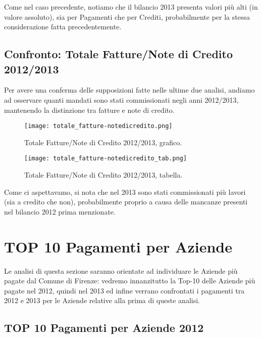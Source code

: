 			Come nel caso precedente, notiamo che il bilancio 2013 presenta valori più alti (in valore assoluto), sia per Pagamenti che per Crediti, probabilmente per la stessa considerazione fatta precedentemente.
			
			\FloatBarrier
			
		\subsection{Confronto: Totale Fatture/Note di Credito 2012/2013} \label{subsec:fatture/notedicredito}
		
			Per avere una conferma delle supposizioni fatte nelle ultime due analisi, andiamo ad osservare quanti mandati sono stati commissionati negli anni 2012/2013, mantenendo la distinzione tra fatture e note di credito.\\
		
			\begin{figure}[h!]
				\centering
					\texttt{[image: totale\_fatture-notedicredito.png]}
				\caption{Totale Fatture/Note di Credito 2012/2013, grafico.}
				\label{fig:totale_fatture-notedicredito}
			\end{figure}
			
			\begin{figure}[h!]
				\centering
					\texttt{[image: totale\_fatture-notedicredito\_tab.png]}
				\caption{Totale Fatture/Note di Credito 2012/2013, tabella.}
				\label{fig:totale_fatture-notedicredito_tab}
			\end{figure}
			
			Come ci aspettavamo, si nota che nel 2013 sono stati commissionati più lavori (sia a credito che non), probabilmente proprio a causa delle mancanze presenti nel bilancio 2012 prima menzionate.
			
			\FloatBarrier
			
	\section{TOP 10 Pagamenti per Aziende} \label{sec:pagamenti_aziende}
		
		Le analisi di questa sezione saranno orientate ad individuare le Aziende più pagate dal Comune di Firenze: vedremo innanzitutto la Top-10 delle Aziende più pagate nel 2012, quindi nel 2013 ed infine verrano confrontati i pagamenti tra 2012 e 2013 per le Aziende relative alla prima di queste analisi.
		
		\subsection{TOP 10 Pagamenti per Aziende 2012} \label{subsec:pagamenti_aziende_2012}
		
